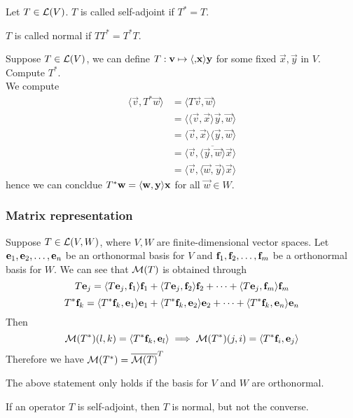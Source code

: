 \begin{definition}
Let $T \in \mathcal L(V)$. $T$ is called self-adjoint if $T^* = T$.
\end{definition}
\begin{definition}
	$T$ is called normal if $TT^* = T^*T$.
\end{definition}
\begin{example}
	Suppose $T \in \mathcal L(V)$, we can define $T: \mathbf v \mapsto \langle \mathbf , \mathbf x \rangle \mathbf y$ for some fixed $\vec x, \vec y$ in $V$. Compute $T^*$. \\
	We compute 
	\begin{align*}
		\langle \vec v, T^* \vec w \rangle &= \langle T \vec v, \vec w \rangle  \\
		&= \langle \langle \vec v, \vec x \rangle \vec y, \vec w \rangle  \\
		&= \langle \vec v, \vec x \rangle \langle \vec y, \vec w \rangle \\
		 &= \langle \vec v, \overline{\langle \vec y, \vec w \rangle} \vec x \rangle \\
		 &= \langle \vec v, \langle \vec w, \vec y \rangle \vec x \rangle
	\end{align*}
	hence we can concldue $T^* \mathbf w = \langle \mathbf w, \mathbf y \rangle \mathbf x$ for all $\vec w \in W$.
\end{example}
\newpage
\subsubsection{Matrix representation}
Suppose $T \in \mathcal L(V,W)$, where $V,W$ are finite-dimensional vector spaces. Let ${\mathbf e}_1,{\mathbf e}_2, \ldots, {\mathbf e}_{n}$ be an orthonormal basis for $V$ and ${\mathbf f}_1,{\mathbf f}_2, \ldots, {\mathbf f}_{m}$ be a orthonormal basis for $W$. We can see that $\mathcal M(T)$ is obtained through
\[ T \mathbf e_j = \langle T\mathbf e_j, \mathbf f_1 \rangle \mathbf f_1 + \langle T\mathbf e_j, \mathbf f_2 \rangle \mathbf f_2 + \cdots + \langle T\mathbf e_j, \mathbf f_m \rangle \mathbf f_m\]
\[ T^* \mathbf f_k = \langle T^* \mathbf f_k, \mathbf e_1 \rangle \mathbf e_1 + \langle T^* \mathbf f_k, \mathbf e_2 \rangle \mathbf e_2 + \cdots + \langle T^* \mathbf f_k, \mathbf e_n \rangle \mathbf e_n\]
Then 
\[ \mathcal M(T^*)(l,k) = \langle T^* \mathbf f_k, \mathbf e_l \rangle \implies \mathcal M(T^*)(j,i) = \langle T^* \mathbf f_i, \mathbf e_j \rangle \]
Therefore we have $\mathcal M(T^*) = \overline{\mathcal M(T)}^T$
\begin{remark}
	The above statement only holds if the basis for $V$ and $W$ are orthonormal.
\end{remark}
\begin{remark}
	If an operator $T$ is self-adjoint, then $T$ is normal, but not the converse.
\end{remark}

